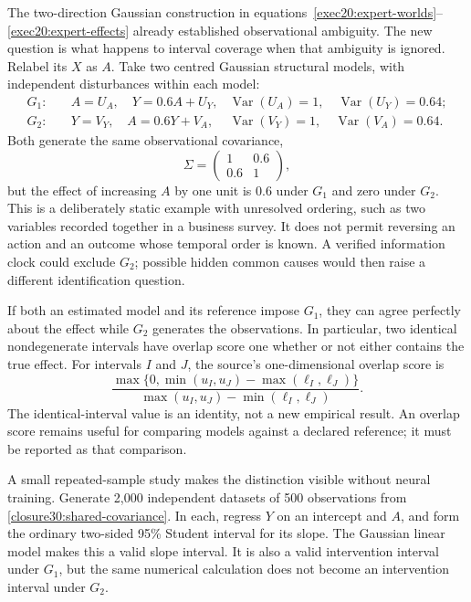 \ifdefined\GraphUncertaintyIntegrated
The two-direction Gaussian construction in
equations~\eqref{exec20:expert-worlds}--\eqref{exec20:expert-effects} already
established observational ambiguity. The new question is what happens to
interval coverage when that ambiguity is ignored. Relabel its $X$ as $A$.
\fi
Take two centred Gaussian structural models, with independent disturbances
within each model:
\begin{align}
 G_1:&\quad A=U_A,\quad Y=0.6A+U_Y,
 &\operatorname{Var}(U_A)=1,\quad\operatorname{Var}(U_Y)=0.64;\nonumber\\
 G_2:&\quad Y=V_Y,\quad A=0.6Y+V_A,
 &\operatorname{Var}(V_Y)=1,\quad\operatorname{Var}(V_A)=0.64.
 \label{closure30:two-gaussian-worlds}
\end{align}
Both generate the same observational covariance,
\begin{equation}
 \Sigma=\begin{pmatrix}1&0.6\\0.6&1\end{pmatrix},
 \label{closure30:shared-covariance}
\end{equation}
but the effect of increasing $A$ by one unit is $0.6$ under $G_1$ and zero
under $G_2$. This is a deliberately static example with unresolved ordering,
such as two variables recorded together in a business survey. It does not
permit reversing an action and an outcome whose temporal order is known.
A verified information clock could exclude $G_2$; possible hidden common
causes would then raise a different identification question.

If both an estimated model and its reference impose $G_1$, they can agree
perfectly about the effect while $G_2$ generates the observations. In
particular, two identical nondegenerate intervals have overlap score one
whether or not either contains the true effect. For intervals $I$ and $J$,
the source's one-dimensional overlap score is
\begin{equation}
 \frac{\max\{0,\min(u_I,u_J)-\max(\ell_I,\ell_J)\}}
 {\max(u_I,u_J)-\min(\ell_I,\ell_J)}.
 \label{closure30:interval-agreement}
\end{equation}
The identical-interval value is an identity, not a new empirical result.
An overlap score remains useful for comparing models against a declared
reference; it must be reported as that comparison.
\citep[p.~61, equations (23)--(24)]{closure30molero}

A small repeated-sample study makes the distinction visible without neural
training. Generate 2,000 independent datasets of 500 observations from
\eqref{closure30:shared-covariance}. In each, regress $Y$ on an intercept and
$A$, and form the ordinary two-sided 95\% Student interval for its slope.
The Gaussian linear model makes this a valid slope interval. It is also a
valid intervention interval under $G_1$, but the same numerical calculation
does not become an intervention interval under $G_2$.

